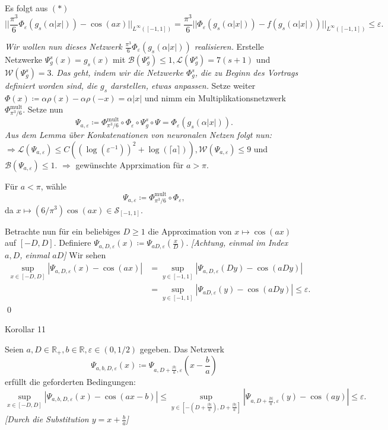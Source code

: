 \documentclass[12pt]{article}
\newcommand{\R}{\mathbb{R}} %
\begin{document}
Es folgt aus \((*)\)
\[ || \frac{\pi^3}{6} \Phi_\varepsilon (g_s(\alpha |x|)) - \cos(ax) ||_{L^{\infty}([-1,1])} = \frac{\pi^3}{6} ||\Phi_\varepsilon (g_s(\alpha |x|)) - f(g_s(\alpha |x|))||_{L^\infty ([-1,1])} \leq \varepsilon. \]

\textit{Wir wollen nun dieses Netzwerk \(\frac{\pi^3}{6} \Phi_\varepsilon (g_s(\alpha |x|))\) realisieren.}
Erstelle Netzwerke \(\Psi_g^s(x) = g_s(x)\) mit \(\mathcal{B}(\Psi_g^s) \leq 1, \mathcal{L}(\Psi_g^s ) = 7(s+1)\) und \(\mathcal{W}(\Psi_g^s) = 3\).
\textit{Das geht, indem wir die Netzwerke \(\Phi_g^s\), die zu Beginn des Vortrags definiert worden sind, die \(g_s\) darstellen, etwas anpassen.}
Setze weiter \(\Phi(x) \coloneqq \alpha \rho(x) - \alpha \rho(-x) = \alpha |x|\) 
und nimm ein Multiplikationsnetzwerk \(\Phi_{\pi^3/6}^{\text{mult}}\). Setze nun 
\[ \Psi_{a,\varepsilon} \coloneqq \Phi_{\pi^3/6}^{\text{mult}} \circ \Phi_\varepsilon \circ \Psi_g^s \circ \Psi = \Phi_\varepsilon(g_s(\alpha |x|)). \]
\textit{Aus dem Lemma über Konkatenationen von neuronalen Netzen folgt nun:}
\(\Rightarrow \mathcal{L}(\Psi_{a,\varepsilon}) \leq C ((\log(\varepsilon^{-1}))^2 + \log(\lceil a \rceil) ), \mathcal{W}(\Psi_{a,\varepsilon}) \leq 9\) 
und \( \mathcal{B}(\Psi_{a,\varepsilon}) \leq 1 \). 
\(\Rightarrow\) gewünschte Apprximation für \(a > \pi\).

Für \(a < \pi\), wähle 
\[ \Psi_{a,\varepsilon} \coloneqq \Phi_{\pi^3/6}^{\text{mult}} \circ \Phi_\varepsilon,  \]
da \(x\mapsto (6/\pi^3) \cos(ax) \in \mathcal{S}_{[-1,1]}\).

Betrachte nun für ein beliebiges \(D\geq 1\) die Approximation von \(x \mapsto \cos(ax)\) auf \([-D,D]\). 
Definiere \(\Psi_{a,D,\varepsilon}(x) \coloneqq \Psi_{aD,\varepsilon}(\frac{x}{D})\). \textit{[Achtung, einmal im Index \(a,D\), einmal \(aD\)]} Wir sehen 
\begin{align*}
    \sup_{x\in [-D,D]} |\Psi_{a,D,\varepsilon}(x) - \cos(ax)| &= \sup_{y\in [-1,1]} |\Psi_{a,D,\varepsilon} (Dy) - \cos(aDy) | \\
    &= \sup_{y\in [-1,1]} |\Psi_{aD,\varepsilon}(y) - \cos(aDy)| \leq \varepsilon. 
\end{align*}\qed

\newpage

{\Large Korollar 11} %

Seien \(a,D\in \R_+, b\in \R, \varepsilon \in (0, 1/2)\) gegeben. 
Das Netzwerk 
\[ \Psi_{a,b,D,\varepsilon}(x) \coloneqq \Psi_{a, D + \frac{|b|}{a}, \varepsilon}(x - \frac{b}{a}) \]
erfüllt die geforderten Bedingungen: 
\[ \sup_{x\in [-D,D]} |\Psi_{a,b,D,\varepsilon}(x) - \cos(ax-b) | \leq \sup_{y \in [-(D+\frac{|b|}{a}), D+ \frac{|b|}{a}]} |\Psi_{a,D+\frac{|b|}{a},\varepsilon}(y) - \cos(ay)| \leq \varepsilon. \]
\textit{[Durch die Substitution \(y = x + \frac{b}{a}\)]}
\end{document}
